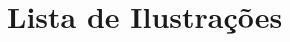 \documentclass[monografia.tex]{subfiles}
\begin{document}
	\chapter*{Lista de Ilustrações}
	
\end{document}
